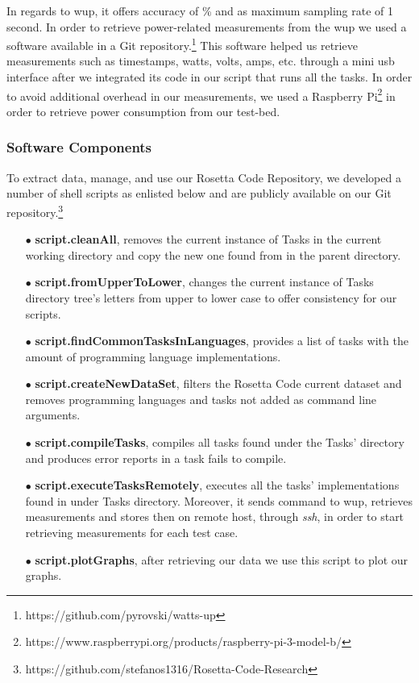 In regards to {\sc wup}, it offers accuracy of \% and 
as maximum sampling rate of 1 second. 
In order to retrieve power-related measurements from the {\sc wup} 
we used a software available in a Git repository.\footnote{https://github.com/pyrovski/watts-up}
This software helped us retrieve measurements such as timestamps, 
watts, volts, amps, etc. through a mini {\sc usb} interface after 
we integrated its code in our script that runs all the tasks. 
In order to avoid additional overhead in our measurements, we 
used a Raspberry Pi\footnote{https://www.raspberrypi.org/products/raspberry-pi-3-model-b/} 
in order to retrieve power consumption from our test-bed.  


\subsubsection{Software Components} \label{software_components}
To extract data, manage, and use our Rosetta Code Repository, 
we developed a number of shell scripts as enlisted below and are 
publicly available on our Git repository.\footnote{https://github.com/stefanos1316/Rosetta-Code-Research} 

\begin{enumerate}
	\item [$\bullet$] \textbf{script.cleanAll}, removes the current instance 
	of Tasks in the current working directory and copy the new one found 
	from in the parent directory. 
	\item [$\bullet$] \textbf{script.fromUpperToLower}, changes the current 
	instance of Tasks directory tree's letters from upper to lower 
	case to offer consistency for our scripts. 
	\item [$\bullet$] \textbf{script.findCommonTasksInLanguages}, provides 
	a list of tasks with the amount of programming language implementations.
	\item [$\bullet$] \textbf{script.createNewDataSet}, filters the Rosetta 
	Code current dataset and removes programming languages and tasks not 
	added as command line arguments.
	\item [$\bullet$] \textbf{script.compileTasks}, compiles all tasks found 
	under the Tasks' directory and produces error reports in a task fails to 
	compile.
	\item [$\bullet$] \textbf{script.executeTasksRemotely}, executes all the tasks' 
	implementations found in under Tasks directory. 
	Moreover, it sends command to {\sc wup}, retrieves measurements and stores 
	then on remote host, through \textit{ssh}, in order to start retrieving 
	measurements for each test case. 
	\item [$\bullet$] \textbf{script.plotGraphs}, after retrieving our data 
	we use this script to plot our graphs.
\end{enumerate}


